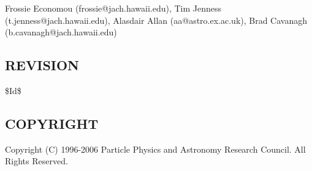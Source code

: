 \documentclass[twoside,11pt]{article}
\renewcommand{\_}{\texttt{\symbol{95}}}
\begin{document}
Frossie Economou (frossie@jach.hawaii.edu),
Tim Jenness (t.jenness@jach.hawaii.edu),
Alasdair Allan (aa@astro.ex.ac.uk),
Brad Cavanagh (b.cavanagh@jach.hawaii.edu)

\subsection*{REVISION\label{oracdr_nuke_REVISION}}


\$Id\$

\subsection*{COPYRIGHT\label{oracdr_nuke_COPYRIGHT}}


Copyright (C) 1996-2006 Particle Physics and Astronomy Research Council.
All Rights Reserved.




\end{document}
